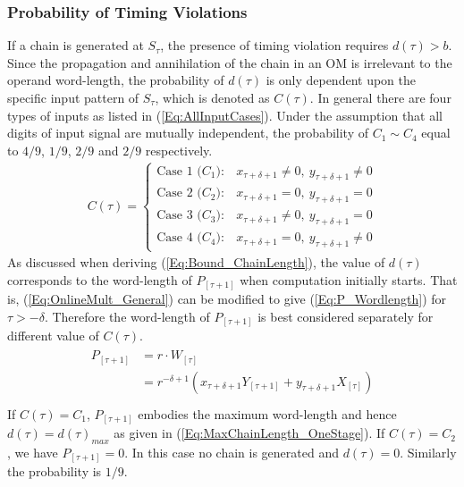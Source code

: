 \documentclass{acm_proc_article-sp}
\begin{document}
\subsubsection{Probability of Timing Violations}
If a chain is generated at $S_{\tau}$, the presence of timing violation requires $d(\tau)>b$. Since the propagation and annihilation of the chain in an OM is irrelevant to the operand word-length, the probability of $d(\tau)$ is only dependent upon the specific input pattern of $S_{\tau}$, which is denoted as $C(\tau)$. In general there are four types of inputs as listed in (\ref{Eq:AllInputCases}). Under the assumption that all digits of input signal are mutually independent, the probability of $C_1\sim C_4$ equal to $4/9$, $1/9$, $2/9$ and $2/9$ respectively.
%
\begin{eqnarray}\label{Eq:AllInputCases}
  C(\tau)=\left\{\begin{matrix}
    \text{Case 1~(}C_1{):} & x_{\tau+\delta+1}\neq0,~y_{\tau+\delta+1}\neq0\\
    \text{Case 2~(}C_2{):} & x_{\tau+\delta+1}=0,~y_{\tau+\delta+1}=0\\
    \text{Case 3~(}C_3{):} & x_{\tau+\delta+1}\neq0,~y_{\tau+\delta+1}=0\\
    \text{Case 4~(}C_4{):} & x_{\tau+\delta+1}=0,~y_{\tau+\delta+1}\neq0
  \end{matrix}\right.
\end{eqnarray}
%
As discussed when deriving (\ref{Eq:Bound_ChainLength}), the value of $d(\tau)$ corresponds to the word-length of $P_{[\tau+1]}$ when computation initially starts. That is, (\ref{Eq:OnlineMult_General}) can be modified to give (\ref{Eq:P_Wordlength}) for $\tau>-\delta$. Therefore the word-length of $P_{[\tau+1]}$ is best considered separately for different value of $C(\tau)$.
\begin{eqnarray}\label{Eq:P_Wordlength}
  \begin{aligned}
    P_{[\tau+1]} &= r\cdot W_{[\tau]}\\
                 &= r^{-\delta+1}(x_{\tau+\delta+1}Y_{[\tau+1]}+y_{\tau+\delta+1}X_{[\tau]})\\
  \end{aligned}
\end{eqnarray}
%
If $C(\tau)=C_1$, $P_{[\tau+1]}$ embodies the maximum word-length and hence $d(\tau)=d(\tau)_{max}$ as given in (\ref{Eq:MaxChainLength_OneStage}). If $C(\tau)=C_2$, we have $P_{[\tau+1]}=0$. In this case no chain is generated and $d(\tau)=0$. Similarly the probability is $1/9$.
\end{document}
